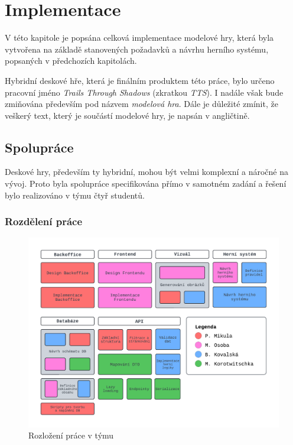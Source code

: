 \chapter{Implementace}
\label{chap:development}

V této kapitole je popsána celková implementace modelové hry, která byla vytvořena na základě stanovených požadavků a návrhu herního systému, popsaných v předchozích kapitolách.

Hybridní deskové hře, která je finálním produktem této práce, bylo určeno pracovní jméno \textit{Trails Through Shadows} (zkratkou \textit{TTS}). I nadále však bude zmiňována především pod názvem \textit{modelová hra}. Dále je důležité zmínit, že veškerý text, který je součástí modelové hry, je napsán v angličtině.

\section{Spolupráce}
\label{sec:collaboration}

Deskové hry, především ty hybridní, mohou být velmi komplexní a náročné na vývoj. Proto byla spolupráce specifikována přímo v samotném zadání a řešení bylo realizováno v týmu čtyř studentů.

\subsection{Rozdělení práce}
\label{subsec:job_distribution}

\begin{figure}[h]
    \centering
    \includegraphics[width=\textwidth]{../../shared/diagrams/blocks.pdf}
    \caption{Rozložení práce v týmu}
    \label{fig:job_distribution}
\end{figure}

